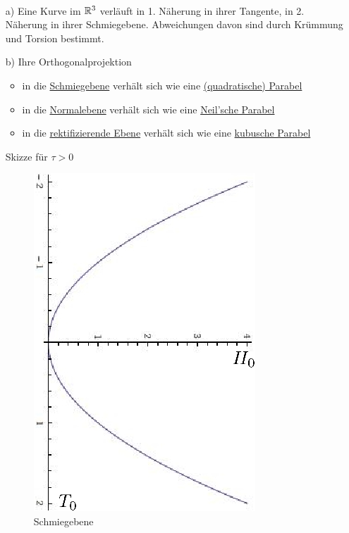 \begin{folgerung} \(\)
 \begin{enumerate}
  \item[a)] Eine Kurve im \(\mathbb{R}^3\) verläuft in 1. Näherung in ihrer Tangente, in 2. Näherung in ihrer Schmiegebene. Abweichungen davon sind durch Krümmung und Torsion bestimmt.
  \item[b)] Ihre Orthogonalprojektion
  \begin{itemize}
   \item in die \uline{Schmiegebene} verhält sich wie eine \uline{(quadratische) Parabel}
   \item in die \uline{Normalebene} verhält sich wie eine \uline{Neil'sche Parabel}
   \item in die \uline{rektifizierende Ebene} verhält sich wie eine \uline{kubusche Parabel}
  \end{itemize}
  Skizze für \(\tau > 0\) \\
  \begin{figure}[ht]
  \begin{minipage}{5cm}
    \centering
   \includegraphics[scale=0.2]{Bilder/T0H0.jpg} \\
   Schmiegebene
  \end{minipage}
  \begin{minipage}{5cm}
   \centering

\end{minipage}
\end{figure}
\end{enumerate}
\end{folgerung}
